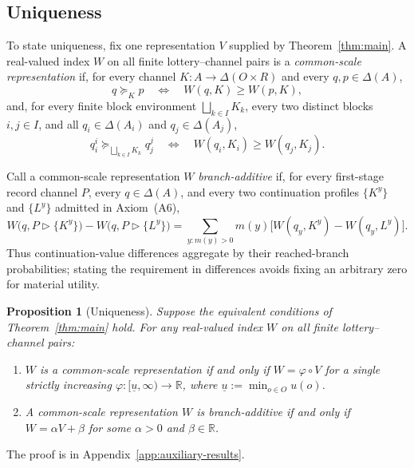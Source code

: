 \documentclass[11pt,a4paper]{article}
\newtheorem{proposition}[theorem]{Proposition}
\theoremstyle{definition}
\newcommand{\D}{\Delta}
\newcommand{\1}{\mathbf 1}
\begin{document}
\subsection{Uniqueness}

To state uniqueness, fix one representation $V$ supplied by Theorem~\ref{thm:main}.  A real-valued index $W$ on all
finite lottery--channel pairs is a \emph{common-scale representation} if, for every channel
$K:A\to\D(O\times R)$ and every $q,p\in\D(A)$,
\[
 q\succeq_Kp
 \quad\Longleftrightarrow\quad
 W(q,K)\ge W(p,K),
\]
and, for every finite block environment $\bigsqcup_{k\in I}K_k$, every two distinct blocks $i,j\in I$, and all
$q_i\in\D(A_i)$ and $q_j\in\D(A_j)$,
\[
 q_i^i\succeq_{\bigsqcup_{k\in I}K_k}q_j^j
 \quad\Longleftrightarrow\quad
 W(q_i,K_i)\ge W(q_j,K_j).
\]

Call a common-scale representation $W$ \emph{branch-additive} if, for every first-stage record channel $P$, every
$q\in\D(A)$, and every two continuation profiles $\{K^y\}$ and $\{L^y\}$ admitted in Axiom~\textup{(A6)},
\begin{equation}
 W\bigl(q,P\triangleright\{K^y\}\bigr)
 -W\bigl(q,P\triangleright\{L^y\}\bigr)
 =\sum_{y:m(y)>0}m(y)
 \bigl[W(q_y,K^y)-W(q_y,L^y)\bigr].
 \label{eq:branch-additive-index}
\end{equation}
Thus continuation-value differences aggregate by their reached-branch probabilities; stating the requirement in
differences avoids fixing an arbitrary zero for material utility.

\begin{proposition}[Uniqueness]\label{prop:uniqueness}
Suppose the equivalent conditions of Theorem~\ref{thm:main} hold.  For any real-valued index $W$ on all finite
lottery--channel pairs:
\begin{enumerate}[label=\textup{(\roman*)},leftmargin=*]
\item $W$ is a common-scale representation if and only if $W=\varphi\circ V$ for a single strictly increasing
$\varphi:[\underline u,\infty)\to\mathbb R$, where $\underline u:=\min_{o\in O}u(o)$.
\item A common-scale representation $W$ is branch-additive if and only if
$W=\alpha V+\beta$ for some $\alpha>0$ and $\beta\in\mathbb R$.
\end{enumerate}
\end{proposition}

The proof is in Appendix~\ref{app:auxiliary-results}.
\end{document}
